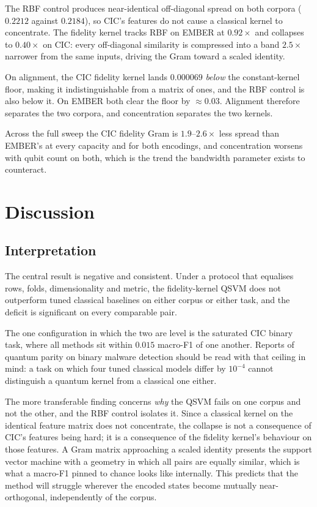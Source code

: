 \documentclass[11pt]{article}
\begin{document}
The RBF control produces near-identical off-diagonal spread on both corpora
($0.2212$ against $0.2184$), so CIC's features do not cause a classical kernel to
concentrate. The fidelity kernel tracks RBF on EMBER at $0.92\times$ and collapses
to $0.40\times$ on CIC: every off-diagonal similarity is compressed into a band
$2.5\times$ narrower from the same inputs, driving the Gram toward a scaled
identity.

On alignment, the CIC fidelity kernel lands $0.000069$ \emph{below} the
constant-kernel floor, making it indistinguishable from a matrix of ones, and the
RBF control is also below it. On EMBER both clear the floor by $\approx 0.03$.
Alignment therefore separates the two corpora, and concentration separates the
two kernels.

Across the full sweep the CIC fidelity Gram is $1.9$--$2.6\times$ less spread than
EMBER's at every capacity and for both encodings, and concentration worsens with
qubit count on both, which is the trend the bandwidth parameter exists to
counteract.

\section{Discussion}

\subsection{Interpretation}

The central result is negative and consistent. Under a protocol that equalises
rows, folds, dimensionality and metric, the fidelity-kernel QSVM does not
outperform tuned classical baselines on either corpus or either task, and the
deficit is significant on every comparable pair.

The one configuration in which the two are level is the saturated CIC binary
task, where all methods sit within $0.015$ macro-F1 of one another. Reports of
quantum parity on binary malware detection should be read with that ceiling in
mind: a task on which four tuned classical models differ by $10^{-4}$ cannot
distinguish a quantum kernel from a classical one either.

The more transferable finding concerns \emph{why} the QSVM fails on one corpus
and not the other, and the RBF control isolates it. Since a classical kernel on
the identical feature matrix does not concentrate, the collapse is not a
consequence of CIC's features being hard; it is a consequence of the fidelity
kernel's behaviour on those features. A Gram matrix approaching a scaled identity
presents the support vector machine with a geometry in which all pairs are
equally similar, which is what a macro-F1 pinned to chance looks like internally.
This predicts that the method will struggle wherever the encoded states become
mutually near-orthogonal, independently of the corpus.
\end{document}
